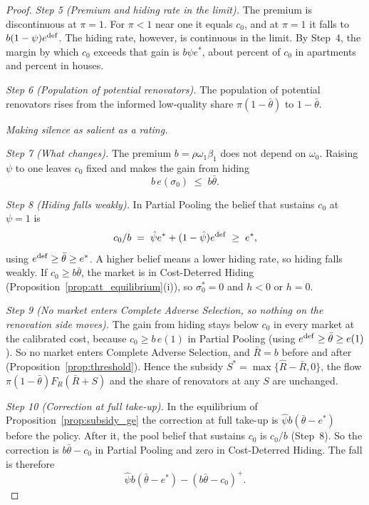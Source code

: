 \begin{proof}
\emph{Step 5 (Premium and hiding rate in the limit).} The premium is discontinuous at $\pi=1$. For $\pi<1$ near one it equals $c_0$, and at $\pi=1$ it falls to $b(1-\psi)e^{\rm def}$. The hiding rate, however, is continuous in the limit. By Step~4, the margin by which $c_0$ exceeds that gain is $b\psi e^*$, about \attPiOneMarginApt{} percent of $c_0$ in apartments and \attPiOneMarginHouse{} percent in houses.

\emph{Step 6 (Population of potential renovators).} The population of potential renovators rises from the informed low-quality share $\pi(1-\bar\theta)$ to $1-\bar\theta$.

\medskip\noindent\emph{Making silence as salient as a rating.}

\emph{Step 7 (What changes).} The premium $b=\rho\omega_1\beta_1$ does not depend on $\omega_0$. Raising $\psi$ to one leaves $c_0$ fixed and makes the gain from hiding
\begin{equation*}
    b\,e(\sigma_0)\;\le\;b\bar\theta.
\end{equation*}

\emph{Step 8 (Hiding falls weakly).} In Partial Pooling the belief that sustains $c_0$ at $\psi=1$ is
\begin{equation*}
    c_0/b\;=\;\hat\psi e^*+(1-\hat\psi)e^{\rm def}\;\ge\;e^*,
\end{equation*}
using $e^{\rm def}\ge\bar\theta\ge e^*$. A higher belief means a lower hiding rate, so hiding falls weakly. If $c_0\ge b\bar\theta$, the market is in Cost-Deterred Hiding (Proposition~\ref{prop:att_equilibrium}(i)), so $\sigma_0^*=0$ and $h<0$ or $h=0$.

\emph{Step 9 (No market enters Complete Adverse Selection, so nothing on the renovation side moves).} The gain from hiding stays below $c_0$ in every market at the calibrated cost, because $c_0\ge b\,e(1)$ in Partial Pooling (using $e^{\rm def}\ge\bar\theta\ge e(1)$). So no market enters Complete Adverse Selection, and $\bar R=b$ before and after (Proposition~\ref{prop:threshold}). Hence the subsidy $S^*=\max\{\hat R-\bar R,0\}$, the flow $\pi(1-\bar\theta)F_R(\bar R+S)$ and the share of renovators at any $S$ are unchanged.

\emph{Step 10 (Correction at full take-up).} In the equilibrium of Proposition~\ref{prop:subsidy_ge} the correction at full take-up is $\hat\psi b(\bar\theta-e^*)$ before the policy. After it, the pool belief that sustains $c_0$ is $c_0/b$ (Step~8). So the correction is $b\bar\theta-c_0$ in Partial Pooling and zero in Cost-Deterred Hiding. The fall is therefore
\begin{equation*}
    \hat\psi b(\bar\theta-e^*)-(b\bar\theta-c_0)^+.
\end{equation*}


\end{proof}
